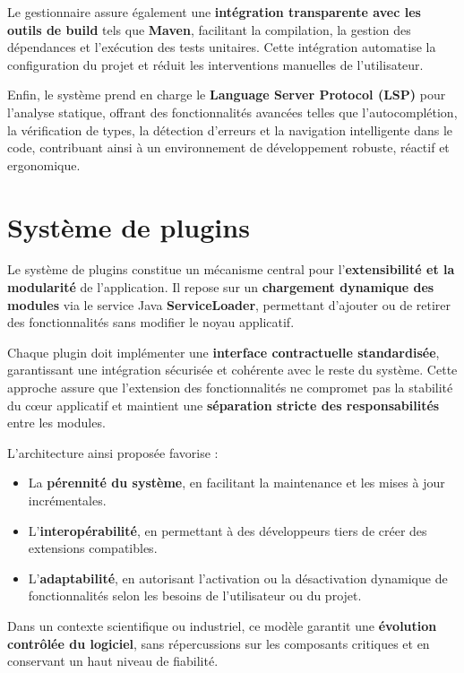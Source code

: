 \documentclass[a4paper,oneside,12pt]{book}
\begin{document}
Le gestionnaire assure également une \textbf{intégration transparente avec les outils de build} tels que \textbf{Maven}, facilitant la compilation, la gestion des dépendances et l’exécution des tests unitaires. Cette intégration automatise la configuration du projet et réduit les interventions manuelles de l’utilisateur.  

Enfin, le système prend en charge le \textbf{Language Server Protocol (LSP)} pour l’analyse statique, offrant des fonctionnalités avancées telles que l’autocomplétion, la vérification de types, la détection d’erreurs et la navigation intelligente dans le code, contribuant ainsi à un environnement de développement robuste, réactif et ergonomique.
\section{\textbf{Système de plugins}}

Le système de plugins constitue un mécanisme central pour l’\textbf{extensibilité et la modularité} de l’application. Il repose sur un \textbf{chargement dynamique des modules} via le service Java \textbf{ServiceLoader}, permettant d’ajouter ou de retirer des fonctionnalités sans modifier le noyau applicatif.  

Chaque plugin doit implémenter une \textbf{interface contractuelle standardisée}, garantissant une intégration sécurisée et cohérente avec le reste du système. Cette approche assure que l’extension des fonctionnalités ne compromet pas la stabilité du cœur applicatif et maintient une \textbf{séparation stricte des responsabilités} entre les modules.  

L’architecture ainsi proposée favorise :  
\begin{itemize}
	\item[-] La \textbf{pérennité du système}, en facilitant la maintenance et les mises à jour incrémentales.  
	\item[-] L’\textbf{interopérabilité}, en permettant à des développeurs tiers de créer des extensions compatibles.  
	\item[-] L’\textbf{adaptabilité}, en autorisant l’activation ou la désactivation dynamique de fonctionnalités selon les besoins de l’utilisateur ou du projet.  
\end{itemize}

Dans un contexte scientifique ou industriel, ce modèle garantit une \textbf{évolution contrôlée du logiciel}, sans répercussions sur les composants critiques et en conservant un haut niveau de fiabilité.
\newpage
\end{document}
